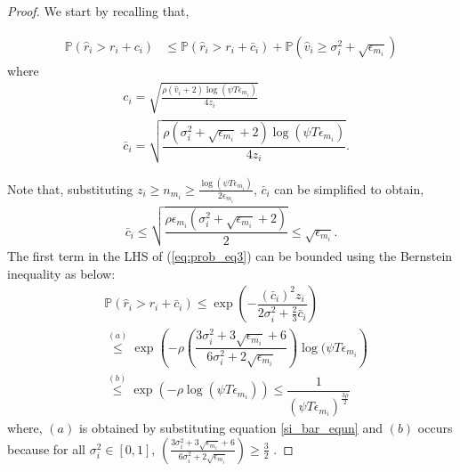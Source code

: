 \begin{proof}

We start by recalling that,

\begin{align}
\mathbb{P}(\hat{r}_{i}> r_{i} + c_{i})
&\leq \mathbb{P}\left( \hat{r}_{i} > r_{i}+ \bar{c}_i\right) 
+ \mathbb{P}\left( \hat{v}_{i}\geq \sigma_{i}^{2}+\sqrt{\epsilon_{m_{i}}}\right)\label{eq:prob_eq3}
\end{align}
where 
\begin{align*}
&c_i =\sqrt{\frac{\rho (\hat{v}_i + 2)\log (\psi T\epsilon_{m_{i}})}{4 z_i}} \\
&\bar{c}_i=\sqrt{\dfrac{\rho (\sigma_{i}^{2}+\sqrt{\epsilon_{m_{i}}} + 2)\log(\psi T\epsilon_{m_{i}})}{4 z_i}}.
\end{align*}

Note that, substituting $ z_i \geq n_{m_i} \geq \frac{\log{(\psi T\epsilon_{m_{i}})}}{2\epsilon_{m_{i}}}$, $\bar{c}_i$ can be simplified to obtain,
\begin{align}
\bar{c}_i
\leq \sqrt{\dfrac{\rho\epsilon_{m_{i}}(\sigma_{i}^{2}+\sqrt{\epsilon_{m_{i}}} + 2)}{2}}\leq \sqrt{ \epsilon_{m_{i}}}.
\label{si_bar_equn}
\end{align}
%
The first term in the LHS of (\ref{eq:prob_eq3}) can be bounded using the Bernstein inequality as below:
\begin{align}
&\mathbb{P}\left( \hat{r}_{i} > r_{i}+ \bar{c}_i\right)\nonumber 
\le \exp\left(- \dfrac{(\bar{c}_i)^2 z_{i}}{2\sigma_i^2 + \frac{2}{3}\bar{c}_i} \right)\nonumber 
\\
& \overset{(a)}{\le} \exp\left(- \rho \left(\dfrac{3\sigma_{i}^{2}+3\sqrt{\epsilon_{m_{i}}} + 6}{6\sigma_i^2 + 2\sqrt{\epsilon_{m_i}}} \right)\log(\psi  T\epsilon_{m_{i}}\right)\nonumber \\
& \overset{(b)}{\leq} \exp\left(- \rho \log(\psi  T\epsilon_{m_{i}})\right) 
\le \dfrac{1}{(\psi  T\epsilon_{m_{i}})^{\frac{3\rho}{2}}}
\label{lhs1_equn}
\end{align}
where, $(a)$ is obtained by substituting equation \ref{si_bar_equn} and $(b)$ occurs because for all $\sigma_{i}^2 \in [0,1]$, $\left(\frac{3\sigma_{i}^{2}+3\sqrt{\epsilon_{m_{i}}} + 6}{6\sigma_i^2 + 2\sqrt{\epsilon_{m_i}}}\right) \geq \frac{3}{2}$ .


\end{proof}
